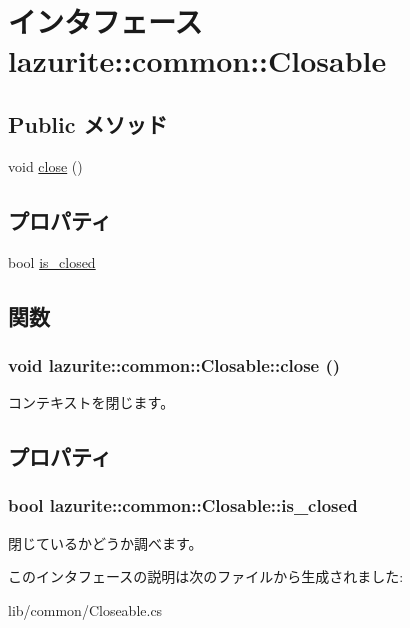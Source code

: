 \hypertarget{interfacelazurite_1_1common_1_1_closable}{
\section{インタフェース lazurite::common::Closable}
\label{interfacelazurite_1_1common_1_1_closable}
}
\subsection*{Public メソッド}
\begin{DoxyCompactItemize}
\item 
void \hyperlink{interfacelazurite_1_1common_1_1_closable_af0be790ae0059ff63da463f108deac2c}{close} ()
\end{DoxyCompactItemize}
\subsection*{プロパティ}
\begin{DoxyCompactItemize}
\item 
bool \hyperlink{interfacelazurite_1_1common_1_1_closable_ae8e10a5babce5f66a2c209ba0b1faf74}{is\_\-closed}
\end{DoxyCompactItemize}


\subsection{関数}
\hypertarget{interfacelazurite_1_1common_1_1_closable_af0be790ae0059ff63da463f108deac2c}{
\subsubsection[{close}]{\setlength{\rightskip}{0pt plus 5cm}void lazurite::common::Closable::close ()}}
\label{interfacelazurite_1_1common_1_1_closable_af0be790ae0059ff63da463f108deac2c}
コンテキストを閉じます。 

\subsection{プロパティ}
\hypertarget{interfacelazurite_1_1common_1_1_closable_ae8e10a5babce5f66a2c209ba0b1faf74}{
\subsubsection[{is\_\-closed}]{\setlength{\rightskip}{0pt plus 5cm}bool lazurite::common::Closable::is\_\-closed}}
\label{interfacelazurite_1_1common_1_1_closable_ae8e10a5babce5f66a2c209ba0b1faf74}
閉じているかどうか調べます。 

このインタフェースの説明は次のファイルから生成されました:\begin{DoxyCompactItemize}
\item 
lib/common/Closeable.cs\end{DoxyCompactItemize}
